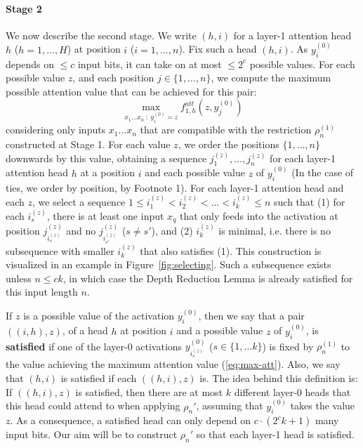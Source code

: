 \documentclass[11pt,a4paper]{article}
\newcommand{\key}[1]{\textbf{#1}}
\begin{document}
\paragraph{Stage 2}
We now describe the second stage.
We write $(h,i)$ for a layer-1 attention head $h$ ($h=1,\dots, H$) at position $i$ ($i=1, \dots, n$).
Fix such a head $(h,i)$.
As $y^{(0)}_i$ depends on $\leq c$ input bits, it can take on at most $\leq 2^c$ possible values.
For each possible value $z$,  and each position $j \in \{1, \dots, n\}$, we compute the maximum possible attention value that can be achieved for this pair:
\begin{equation}\label{eq:max-att}
\max_{x_1\dots x_n\ :\ y^{(0)}_i=z} f^{att}_{1,h}(z, y^{(0)}_j)
\end{equation}
considering only inputs $x_1\dots x_n$ that are compatible with the restriction $\rho^{(1)}_n$ constructed at Stage 1.
For each value $z$, we order the positions $\{1, \dots, n\}$ downwards by this value, obtaining a sequence $j_1^{(z)}, \dots, j_n^{(z)}$ for each layer-1 attention head $h$ at a position $i$ and each possible value $z$ of $y^{(0)}_i$ (In the case of ties, we order by  position, by Footnote 1).
For each layer-1 attention head and each $z$, we select a sequence $1 \leq i_1^{(z)} < i_2^{(z)} < \dots < i_{k}^{(z)} \leq n$ such that (1) for each $i_s^{(z)}$, there is at least one input $x_q$ that only feeds into the activation at position $j_{i_s^{(z)}}^{(z)}$ and no $j_{i_{s'}^{(z)}}^{(z)}$ ($s\neq s'$), and (2) $i_{k}^{(z)}$ is minimal, i.e. there is no subsequence with smaller $i_{k}^{(z)}$ that also satisfies (1).
This construction is visualized in an example in Figure~\ref{fig:selecting}.
Such a subsequence exists unless $n \leq ck$, in which case the Depth Reduction Lemma is already satisfied for this input length $n$.

If $z$ is a possible value of the activation $y^{(0)}_i$, then we
say that a pair $((i,h),z)$, of a head $h$ at position $i$ and a possible value $z$ of $y^{(0)}_i$, is \key{satisfied} if one of the layer-0 activations $y^{(0)}_{i_s^{(z)}}$ ($s \in \{1, \dots k\}$) is fixed by $\rho^{(1)}_n$ to the value achieving the maximum attention value (\ref{eq:max-att}).
Also, we say that $(h,i)$ is satisfied if each $((h,i),z)$ is.
The idea behind this definition is: If $((h,i),z)$ is satisfied, then there are at most $k$ different layer-0 heads that this head could attend to when applying $\rho_n'$, assuming that $y^{(0)}_i$ takes the value $z$.
As a consequence, a satisfied head can only depend on $ c\cdot (2^ck+1)$ many input bits.
Our aim will be to construct $\rho_n'$ so that each layer-1 head is satisfied.
\end{document}
